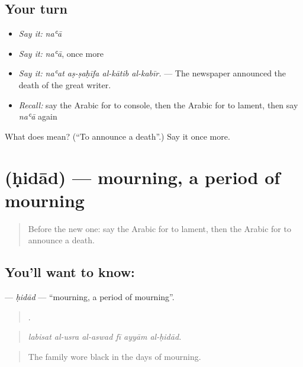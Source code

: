 \subsection*{Your turn}
\begin{itemize}
\raggedright
  \item \emph{Say it:} \emph{naʿā}
  \item \emph{Say it:} \emph{naʿā}, once more
  \item \emph{Say it:} \emph{naʿat aṣ-ṣaḥīfa al-kātib al-kabīr.} — The newspaper announced the death of the great writer.
  \item \emph{Recall:} say the Arabic for to console, then the Arabic for to lament, then say \emph{naʿā} again
\end{itemize}

\begin{tcolorbox}[breakable,colback=teal!4,colframe=teal!35!black,title={Before you move on}]
What does  mean? (\textquotedblleft{}To announce a death\textquotedblright{}.) Say it once more.
\end{tcolorbox}
\section[\texorpdfstring{\ar{حداد} (ḥidād)}{حداد (ḥidād)}]{ (ḥidād) — mourning, a period of mourning}

\label{lesson:AR-C319-hidad}



\begin{quote}
Before the new one: say the Arabic for to lament, then the Arabic for to announce a death.
\end{quote}

\subsection*{You'll want to know: }
\textbf{} — \emph{ḥidād} — \textquotedblleft{}mourning, a period of mourning\textquotedblright{}.

\begin{quote}
     .
\end{quote}

\begin{quote}
\emph{labisat al-usra al-aswad fī ayyām al-ḥidād.}
\end{quote}

\begin{quote}
The family wore black in the days of mourning.
\end{quote}

